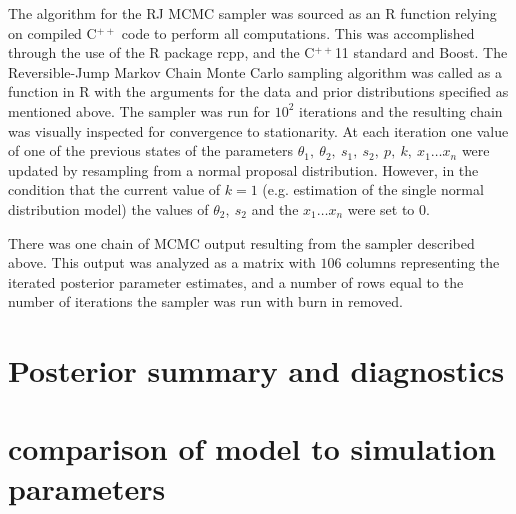 \documentclass[12pt]{article}
\begin{document}
The algorithm for the RJ MCMC sampler was sourced as an R function relying on compiled C$^{++}$ code  to perform all computations. This was accomplished through the use of the R package rcpp, and the C$^{++}$11 standard and Boost.
The Reversible-Jump Markov Chain Monte Carlo sampling algorithm was called as a function in R with the arguments for the data and prior distributions specified as mentioned above. The sampler was run for $10^2$ iterations and the resulting chain was visually inspected for convergence to stationarity. 
At each iteration one value of one of the previous states of the parameters $\theta_1, \ \theta_2, \ s_1, \ s_2, \ p, \ k, \ x_1 \ldots x_n $ were updated by resampling from a normal proposal distribution. However, in the condition that the current value of $k = 1$ (e.g. estimation of the single normal distribution model) the values of $\theta_2, \ s_2$ and the $x_1 \ldots x_n$ were set to 0. 

There was one chain of MCMC output resulting from the sampler described above. This output was analyzed as a matrix with $106$ columns representing the iterated posterior parameter estimates, and a number of rows  equal to the number of iterations the sampler was run with burn in removed.  


\section*{Posterior summary and diagnostics}

\section*{comparison of model to simulation parameters}
\end{document}
